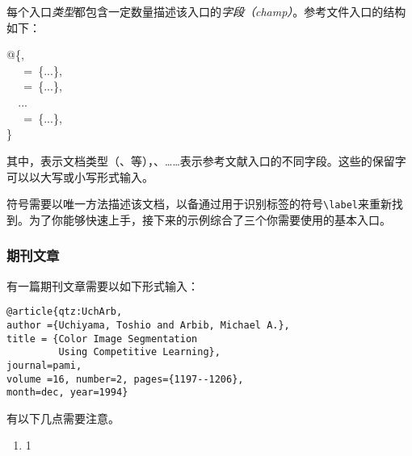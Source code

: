 每个入口\emph{类型}都包含一定数量描述该入口的\emph{字段（champ）}。参考文件入口的结构如下：

\begin{dmd}
@\{,\\
\verb|  |\ =\ \{...\},\\
\verb|  |\ =\ \{...\},\\
\verb|  |...\\
\verb|  |\ =\ \{...\},\\
\}
\end{dmd}

其中，表示文档类型（、等），、……表示参考文献入口的不同字段。这些\bib 的保留字可以以大写或小写形式输入。

符号需要以唯一方法描述该文档，以备通过用于识别标签的符号\verb|\label|来重新找到。为了你能够快速上手\bib ，接下来的示例综合了三个你需要使用的基本入口。

\subsubsection{期刊文章}

有一篇期刊文章需要以如下形式输入：

\begin{dmd}
\begin{verbatim}
@article{qtz:UchArb,
author ={Uchiyama, Toshio and Arbib, Michael A.},
title = {Color Image Segmentation
         Using Competitive Learning},
journal=pami,
volume =16, number=2, pages={1197--1206},
month=dec, year=1994}
\end{verbatim}
\end{dmd}

有以下几点需要注意。

\begin{enumerate}
    \item 1
\end{enumerate}